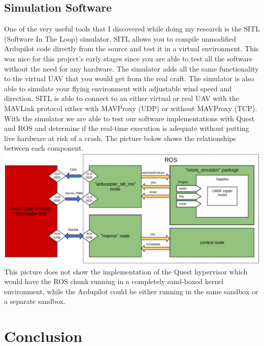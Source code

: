 \documentclass[letterpaper,10pt,notitlepage,fleqn]{article}
\begin{document}
\subsection{Simulation Software}
\indent One of the very useful tools that I discovered while doing my research is the SITL (Software In The Loop) simulator. SITL allows you to compile unmodified Ardupilot code directly from the source and test it in a virtual environment. This was nice for this project's early stages since you are able to test all the software without the need for any hardware. The simulator adds all the same functionality to the virtual UAV that you would get from the real craft. The
simulator is also able to simulate your flying environment with adjustable wind speed and direction. 
SITL is able to connect to an either virtual or real UAV with the MAVLink protocol either with MAVProxy (UDP) or without MAVProxy (TCP). With the simulator we are able to test our software implementations with Quest and ROS and determine if the real-time execution is adequate without putting live hardware at risk of a crash. The picture below shows the relationships between each component.  
\\
\includegraphics[scale=.5]{arducopter_sitl_ros.eps} \\
This picture does not show the implementation of the Quest hypervisor which would have the ROS chunk running in a completely sand-boxed kernel environment, while the Ardupilot could be either running in the same sandbox or a separate sandbox. 

\section{Conclusion}
\end{document}
